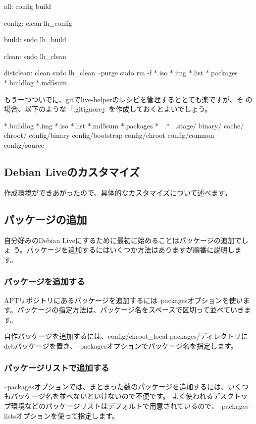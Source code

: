 \documentclass[mingoth,a4paper]{jsarticle}
\begin{document}
\begin{commandline}
all: config build

config: clean
        lh_config

build:
        sudo lh_build

clean:
        sudo lh_clean

distclean: clean
        sudo lh_clean --purge
        sudo rm -f *.iso *.img *.list *.packages *.buildlog *.md5sum
\end{commandline}

もう一つついでに、gitでlive-helperのレシピを管理するととても楽ですが、そ
の場合、以下のような「.gitignore」を作成しておくとよいでしょう。

\begin{commandline}
*.buildlog
*.img
*.iso
*.list
*.md5sum
*.packages
*~
.*~
.stage/
binary/
cache/
chroot/
config/binary
config/bootstrap
config/chroot
config/common
config/source
\end{commandline}

\newpage

\subsection{Debian Liveのカスタマイズ}
作成環境ができあがったので、具体的なカスタマイズについて述べます。

\subsection{パッケージの追加}
自分好みのDebian Liveにするために最初に始めることはパッケージの追加でしょ
う。パッケージを追加するにはいくつか方法はありますが順番に説明します。

\subsubsection{パッケージを追加する}
APTリポジトリにあるパッケージを追加するには--packagesオプションを使います。パッケージの指定方法は、パッケージ名をスペースで区切って並べていきます。


自作パッケージを追加するには、config/chroot\_local-packages/ディレクトリにdebパッケージを置き、--packagesオプションでパッケージ名を指定します。

\subsubsection{パッケージリストで追加する}
--packagesオプションでは、まとまった数のパッケージを追加するには、いくつもパッケージ名を並べないといけないので不便です。
よく使われるデスクトップ環境などのパッケージリストはデフォルトで用意されているので、--packages-listsオプションを使って指定します。
\end{document}

